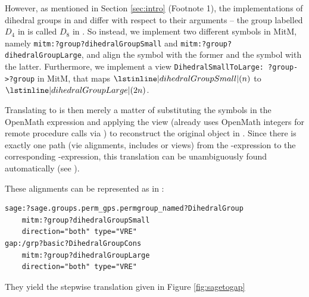 However, as mentioned in Section \ref{sec:intro} (Footnote 1), the implementations of dihedral groups in \Sage and \GAP differ with respect to their arguments -- the group labelled $D_4$ in \Sage is called $D_8$ in \GAP. So instead, we implement two different symbols in MitM, namely \lstinline|mitm:?group?dihedralGroupSmall| and \lstinline|mitm:?group?dihedralGroupLarge|, and align the \Sage symbol with the former and the \GAP symbol with the latter. Furthermore, we implement a view \lstinline|DihedralSmallToLarge: ?group->?group| in MitM, that maps $\lstinline|dihedralGroupSmall|(n)$ to $\lstinline|dihedralGroupLarge|(2n)$.


Translating to \GAP is then merely a matter of substituting the symbols in the OpenMath expression and applying the view (\GAP already uses OpenMath integers for remote procedure calls via \SCSCP) to reconstruct the original \Sage object in \GAP. Since there is exactly one path (vie alignments, includes or views) from the \Sage-expression to the corresponding \GAP-expression, this translation can be unambiguously found automatically (see \cite{MRLR:alignments:17}).

These alignments can be represented as in \ommt: 
\begin{lstlisting}[label=lst:dhalignments,caption=Alignments for Dihedral Groups]
sage:?sage.groups.perm_gps.permgroup_named?DihedralGroup
	mitm:?group?dihedralGroupSmall 
	direction="both" type="VRE"
gap:/grp?basic?DihedralGroupCons							
	mitm:?group?dihedralGroupLarge 
	direction="both" type="VRE"
\end{lstlisting}\medskip

They yield the stepwise translation given in Figure \ref{fig:sagetogap}


